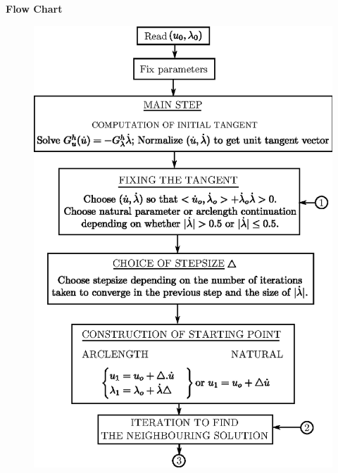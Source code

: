 \begin{center}
\textbf{\Large Flow Chart}\pageoriginale
\end{center}
\vskip -1cm
\begin{figure}[H]
\centering
\includegraphics[scale=1]{vol79-fig/fig79-flowchart1.eps}
\end{figure}


\bigskip


